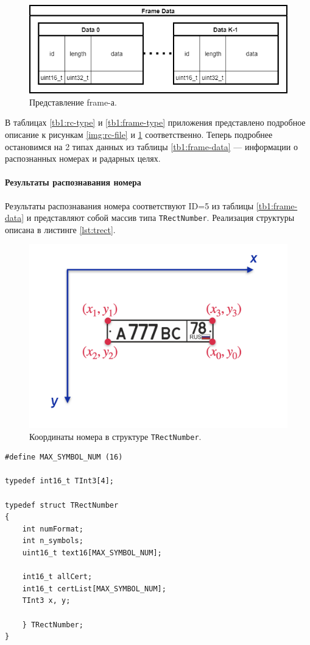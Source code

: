 \documentclass[specification,annotation,times]{itmo-student-thesis}
\begin{document}
\begin{figure}[!ht]
	\caption{Представление frame-а.}\label{img:frame-data}
	\includegraphics[width=0.85\linewidth]{../png/frame_data.png}
	\centering
\end{figure}

В таблицах \ref{tb1:rc-type} и \ref{tb1:frame-type} приложения представлено подробное описание к рисункам \ref{img:rc-file} и \ref{img:frame-data} соответственно. Теперь подробнее остановимся на 2 типах данных из таблицы \ref{tb1:frame-data} --- информации о распознанных номерах и радарных целях.

\paragraph{Результаты распознавания номера}
Результаты распознавания номера соответствуют ID=5 из таблицы \ref{tb1:frame-data} и представляют собой массив типа \texttt{TRectNumber}. Реализация структуры описана в листинге \ref{lst:trect}.

\begin{figure}[!ht]
	\caption{Координаты номера в структуре \texttt{TRectNumber}.}\label{img:licnum-recog-ind}
	\includegraphics[width=0.85\linewidth]{../png/licnum_recog_coords.png}
	\centering
\end{figure}

\begin{lstlisting}[float=!h,caption={Реализация структуры \texttt{TRectNumber}.},label={lst:trect}]
#define	MAX_SYMBOL_NUM (16)

typedef int16_t TInt3[4];

typedef struct TRectNumber
{
	int numFormat;
	int n_symbols;
	uint16_t text16[MAX_SYMBOL_NUM];
	
	int16_t allCert;
	int16_t certList[MAX_SYMBOL_NUM];
	TInt3 x, y;
	
	} TRectNumber;
}
\end{lstlisting}
\end{document}
